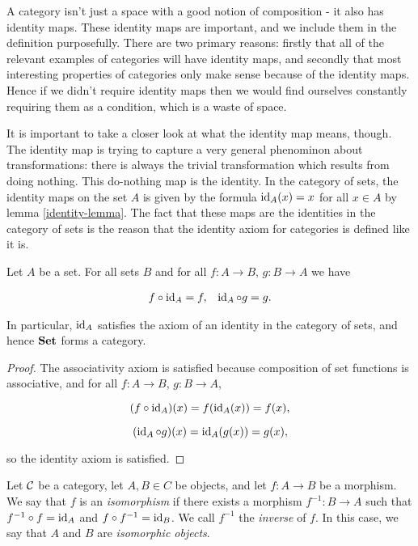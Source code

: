 \begin{rem} A category isn't just a space with a good notion of composition - it also has identity maps. These identity maps are important, and we include them in the definition purposefully. There are two primary reasons: firstly that all of the relevant examples of categories will have identity maps, and secondly that most interesting properties of categories only make sense because of the identity maps. Hence if we didn't require identity maps then we would find ourselves constantly requiring them as a condition, which is a waste of space.

It is important to take a closer look at what the identity map means, though. The identity map is trying to capture a very general phenominon about transformations: there is always the trivial transformation which results from doing nothing. This do-nothing map is the identity. In the category of sets, the identity maps on the set $A$ is given by the formula $\operatorname{id}_A(x)=x$ for all $x\in A$ by lemma \ref{identity-lemma}. The fact that these maps are the identities in the category of sets is the reason that the identity axiom for categories is defined like it is.
\end{rem}

\begin{lem}\label{identity-lemma} Let $A$ be a set. For all sets $B$ and for all $f:A\to B$, $g:B\to A$ we have

\begin{align*}
f\circ \operatorname{id}_{A}=f, && \operatorname{id}_{A}\circ g = g.
\end{align*}

In particular, $\operatorname{id}_A$ satisfies the axiom of an identity in the category of sets, and hence ${\bf Set}$ forms a category.
\end{lem}
\begin{proof} The associativity axiom is satisfied because composition of set functions is associative, and for all $f:A\to B$, $g:B\to A$,

$$(f\circ \operatorname{id}_{A})(x)=f(\operatorname{id}_{A}(x))=f(x),$$

$$(\operatorname{id}_{A}\circ g)(x)=\operatorname{id}_{A}(g(x))=g(x),$$

so the identity axiom is satisfied.
\end{proof}

\begin{defn}[Isomorphism] Let ${\mathcal C}$ be a category, let $A,B\in C$ be objects, and let $f:A\to B$ be a morphism. We say that $f$ is an {\em isomorphism} if there exists a morphism $f^{-1}:B\to A$ such that $f^{-1}\circ f= \operatorname{id}_A$ and $f\circ f^{-1}=\operatorname{id}_B$. We call $f^{-1}$ the {\em inverse} of $f$. In this case, we say that $A$ and $B$ are {\em isomorphic objects}.
\end{defn}

